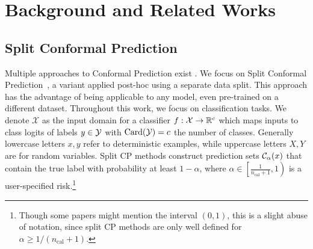 \section{Background and Related Works}

\subsection{Split Conformal Prediction} 

Multiple approaches to Conformal Prediction exist \cite{vovk,gentleintroductionconformalprediction}. We focus on Split Conformal Prediction~\cite{papadopoulos2002inductive}, a variant applied post-hoc using a separate data split. This approach has the advantage of being applicable to any model, even pre-trained on a different dataset. 
Throughout this work, we focus on classification tasks. We denote $\mathcal{X}$ as the input domain for a classifier $f : \mathcal{X} \rightarrow \mathbb{R}^{c}$ which maps inputs to class logits of labels $y \in \mathcal{Y}$ with $\text{Card}(\mathcal{Y}) = c$ the number of classes.  
Generally lowercase letters $x,y$ refer to deterministic examples, while uppercase letters $X,Y$ are for random variables.
Split CP methods construct prediction sets $\mathcal{C}_{\alpha}(x)$ that contain the true label with probability at least $1-\alpha$, where $\alpha\in\left[\frac{1}{n_\mathrm{cal} + 1}, 1\right)$
is a user-specified risk.\footnote{Though some papers might mention the interval $\left(0, 1\right)$, this is a slight abuse of notation, since split CP methods are only well defined for $\alpha \geq 1/(n_\mathrm{cal} + 1)$.} 

